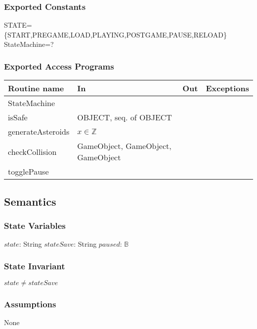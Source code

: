 \documentclass[12pt]{article}
\begin{document}
\subsubsection*{Exported Constants}

STATE=\{START,PREGAME,LOAD,PLAYING,POSTGAME,PAUSE,RELOAD\}\\
StateMachine=?\\

\subsubsection*{Exported Access Programs}

\begin{tabular}{| l | l | l | l |}
    \hline
    \textbf{Routine name} & \textbf{In} & \textbf{Out} & \textbf{Exceptions}\\
    \hline
    StateMachine &  & ~ & ~\\
    \hline
    isSafe & OBJECT, seq. of OBJECT & ~ & ~\\
    \hline
    generateAsteroids & $x \in \mathbb{Z}$ & ~ & ~ \\
    \hline
    checkCollision & GameObject, GameObject, GameObject & ~ & ~ \\
    \hline
    togglePause & ~ & ~ & ~ \\
    \hline
\end{tabular}

\subsection* {Semantics}

\subsubsection* {State Variables}

$state$: String
$stateSave$: String
$paused$: $\mathbb{B}$

\subsubsection* {State Invariant}

$state \neq stateSave$

\subsubsection* {Assumptions}

None
\end{document}
